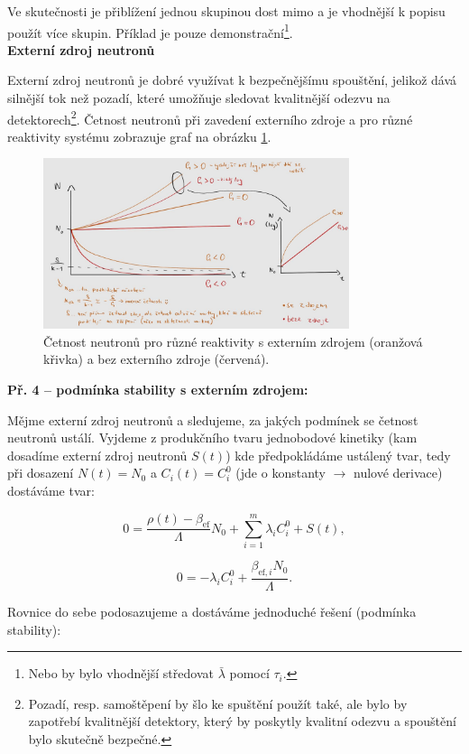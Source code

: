 Ve skutečnosti je přiblížení jednou skupinou dost mimo a je vhodnější k popisu použít více skupin. Příklad je pouze demonstrační\footnote{Nebo by bylo vhodnější středovat $\bar{\lambda}$ pomocí $\tau_i$.}.\\

\textbf{Externí zdroj neutronů}

Externí zdroj neutronů je dobré využívat k bezpečnějšímu spouštění, jelikož dává silnější tok než pozadí, které umožňuje sledovat kvalitnější odezvu na detektorech\footnote{Pozadí, resp. samoštěpení by šlo ke spuštění použít také, ale bylo by zapotřebí kvalitnější detektory, který by poskytly kvalitní odezvu a spouštění bylo skutečně bezpečné.}. Četnost neutronů při zavedení externího zdroje a pro různé reaktivity systému zobrazuje graf na obrázku \ref{fig_zdroj}.

\begin{figure}[H]
  \centering
  \includegraphics[width=0.8\textwidth]{img/zdroj.jpg}
  \caption{Četnost neutronů pro různé reaktivity s externím zdrojem (oranžová křivka) a bez externího zdroje (červená).}
  \label{fig_zdroj}
\end{figure}

\small

\textbf{Př. 4 -- podmínka stability s externím zdrojem:}

Mějme externí zdroj neutronů a sledujeme, za jakých podmínek se četnost neutronů ustálí. Vyjdeme z produkčního tvaru jednobodové kinetiky (kam dosadíme externí zdroj neutronů $S(t)$) kde předpokládáme ustálený tvar, tedy při dosazení $N(t) = N_0$ a $C_i(t) = C_i^0$ (jde o konstanty $\rightarrow$ nulové derivace) dostáváme tvar:

$$ 0 = \dfrac{\rho(t) - \beta_{\text{ef}}}{\Lambda} N_0 + \sum_{i=1}^m \lambda_i C_i^0 + S(t), $$

$$ 0 = -\lambda_i C_i^0 + \dfrac{\beta_{\text{ef},i}  N_0}{\Lambda}. $$

Rovnice do sebe podosazujeme a dostáváme jednoduché řešení (podmínka stability):

